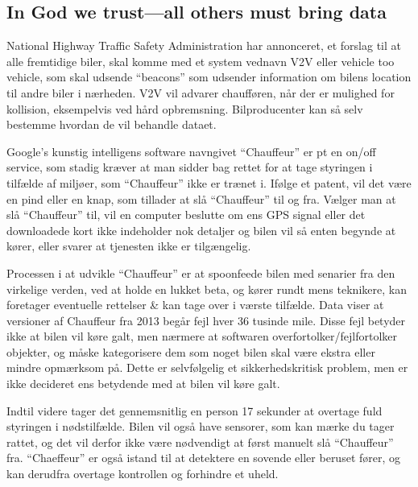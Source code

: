 \subsection {In God we trust—all others must bring data}

National Highway Traffic Safety Administration har annonceret, et forslag til at alle fremtidige biler, skal komme med et system vednavn V2V eller vehicle too vehicle, som skal udsende ``beacons'' som udsender information om bilens location til andre biler i nærheden. V2V vil advarer chaufføren, når der er mulighed for kollision, eksempelvis ved hård opbremsning. Bilproducenter kan så selv bestemme hvordan de vil behandle dataet.\cite {pikerhoar}

Google's kunstig intelligens software navngivet ``Chauffeur'' er pt en on/off service, som stadig kræver at man sidder bag rettet for at tage styringen i tilfælde af miljøer, som ``Chauffeur'' ikke er trænet i. Ifølge et patent, vil det være en pind eller en knap, som tillader at slå ``Chauffeur'' til og fra. Vælger man at slå ``Chauffeur'' til, vil en computer beslutte om ens GPS signal eller det downloadede kort ikke indeholder nok detaljer og bilen vil så enten begynde at kører, eller svarer at tjenesten ikke er tilgængelig.\cite {pornhubftw}

Processen i at udvikle ``Chauffeur'' er at spoonfeede bilen med senarier fra den virkelige verden, ved at holde en lukket beta, og kører rundt mens teknikere, kan foretager eventuelle rettelser & kan tage over i værste tilfælde. Data viser at versioner af Chauffeur fra 2013 begår fejl hver 36 tusinde mile. Disse fejl betyder ikke at bilen vil køre galt, men nærmere at softwaren overfortolker/fejlfortolker objekter, og måske kategorisere dem som noget bilen skal være ekstra eller mindre opmærksom på. Dette er selvfølgelig et sikkerhedskritisk problem, men er ikke decideret ens betydende med at bilen vil køre galt.\cite {pikerhoar}


Indtil videre tager det gennemsnitlig en person 17 sekunder at overtage fuld styringen i nødstilfælde. Bilen vil også have sensorer, som kan mærke du tager rattet, og det vil derfor ikke være nødvendigt at først manuelt slå ``Chauffeur'' fra. ``Chaeffeur'' er også istand til at detektere en sovende eller beruset fører, og kan derudfra overtage kontrollen og forhindre et uheld.\cite {pornhubftw}

